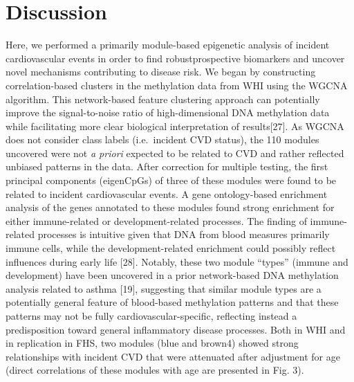 \documentclass[]{article}
\theoremstyle{definition}
\theoremstyle{definition}
\theoremstyle{definition}
\theoremstyle{remark}
\begin{document}
\section{Discussion}\label{discussion}

Here, we performed a primarily module-based epigenetic analysis of
incident cardiovascular events in order to find robustprospective
biomarkers and uncover novel mechanisms contributing to disease risk. We
began by constructing correlation-based clusters in the methylation data
from WHI using the WGCNA algorithm. This network-based feature
clustering approach can potentially improve the signal-to-noise ratio of
high-dimensional DNA methylation data while facilitating more clear
biological interpretation of results{[}27{]}. As WGCNA does not consider
class labels (i.e.~incident CVD status), the 110 modules uncovered were
not \emph{a priori} expected to be related to CVD and rather reflected
unbiased patterns in the data. After correction for multiple testing,
the first principal components (eigenCpGs) of three of these modules
were found to be related to incident cardiovascular events. A gene
ontology-based enrichment analysis of the genes annotated to these
modules found strong enrichment for either immune-related or
development-related processes. The finding of immune-related processes
is intuitive given that DNA from blood measures primarily immune cells,
while the development-related enrichment could possibly reflect
influences during early life {[}28{]}. Notably, these two module
``types'' (immune and development) have been uncovered in a prior
network-based DNA methylation analysis related to asthma {[}19{]},
suggesting that similar module types are a potentially general feature
of blood-based methylation patterns and that these patterns may not be
fully cardiovascular-specific, reflecting instead a predisposition
toward general inflammatory disease processes. Both in WHI and in
replication in FHS, two modules (blue and brown4) showed strong
relationships with incident CVD that were attenuated after adjustment
for age (direct correlations of these modules with age are presented in
Fig. 3).
\end{document}
